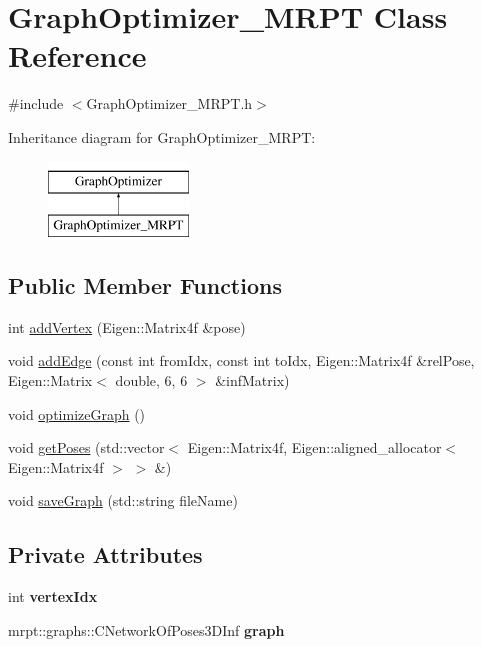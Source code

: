 \hypertarget{class_graph_optimizer___m_r_p_t}{
\section{GraphOptimizer\_\-MRPT Class Reference}
\label{class_graph_optimizer___m_r_p_t}
}


{\ttfamily \#include $<$GraphOptimizer\_\-MRPT.h$>$}

Inheritance diagram for GraphOptimizer\_\-MRPT:\begin{figure}[H]
\begin{center}
\leavevmode
\includegraphics[height=2.000000cm]{class_graph_optimizer___m_r_p_t}
\end{center}
\end{figure}
\subsection*{Public Member Functions}
\begin{DoxyCompactItemize}
\item 
int \hyperlink{class_graph_optimizer___m_r_p_t_a2c5a89fce928859445d3ec2627a0ed3e}{addVertex} (Eigen::Matrix4f \&pose)
\item 
void \hyperlink{class_graph_optimizer___m_r_p_t_a593e4c3752d6e3b6340145e5fd03ad92}{addEdge} (const int fromIdx, const int toIdx, Eigen::Matrix4f \&relPose, Eigen::Matrix$<$ double, 6, 6 $>$ \&infMatrix)
\item 
void \hyperlink{class_graph_optimizer___m_r_p_t_aa60e33c3028018515f01aaae20ec9bd5}{optimizeGraph} ()
\item 
void \hyperlink{class_graph_optimizer___m_r_p_t_a40f1548815f2830a950bb682782793b7}{getPoses} (std::vector$<$ Eigen::Matrix4f, Eigen::aligned\_\-allocator$<$ Eigen::Matrix4f $>$ $>$ \&)
\item 
void \hyperlink{class_graph_optimizer___m_r_p_t_a5456297ea1d91e7cafc55e3a46ee7ad6}{saveGraph} (std::string fileName)
\end{DoxyCompactItemize}
\subsection*{Private Attributes}
\begin{DoxyCompactItemize}
\item 
\hypertarget{class_graph_optimizer___m_r_p_t_af1f16e6edcf0bff4861e940c3ab5987b}{
int {\bfseries vertexIdx}}
\label{class_graph_optimizer___m_r_p_t_af1f16e6edcf0bff4861e940c3ab5987b}

\item 
\hypertarget{class_graph_optimizer___m_r_p_t_aa0edf72c3742a01b7fc87130346a349b}{
mrpt::graphs::CNetworkOfPoses3DInf {\bfseries graph}}
\label{class_graph_optimizer___m_r_p_t_aa0edf72c3742a01b7fc87130346a349b}

\end{DoxyCompactItemize}


